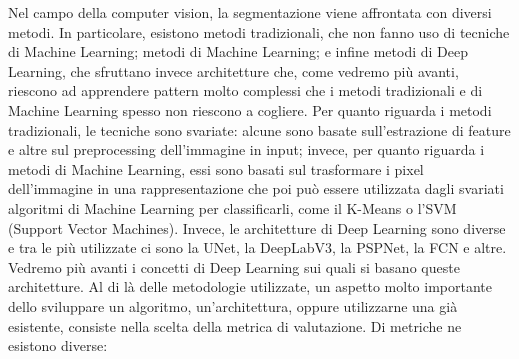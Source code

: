 Nel campo della computer vision, la segmentazione viene affrontata con diversi metodi. In particolare, esistono metodi tradizionali, che non fanno uso di tecniche di Machine Learning; metodi di Machine Learning; e infine metodi di Deep Learning, che sfruttano invece architetture che, come vedremo più avanti, riescono ad apprendere pattern molto complessi che i metodi tradizionali e di Machine Learning spesso non riescono a cogliere.
Per quanto riguarda i metodi tradizionali, le tecniche sono svariate: alcune sono basate sull'estrazione di feature e altre sul preprocessing dell'immagine in input; invece, per quanto riguarda i metodi di Machine Learning, essi sono basati sul trasformare i pixel dell'immagine in una rappresentazione che poi può essere utilizzata dagli svariati algoritmi di Machine Learning per classificarli, come il K-Means o l'SVM (Support Vector Machines). Invece, le architetture di Deep Learning sono diverse e tra le più utilizzate ci sono la UNet\cite{unet}, la DeepLabV3\cite{deeplabv3}, la PSPNet\cite{pspnet}, la FCN\cite{FCNs} e altre. Vedremo più avanti i concetti di Deep Learning sui quali si basano queste architetture.
Al di là delle metodologie utilizzate, un aspetto molto importante dello sviluppare un algoritmo, un'architettura, oppure utilizzarne una già esistente, consiste nella scelta della metrica di valutazione. Di metriche ne esistono diverse:

